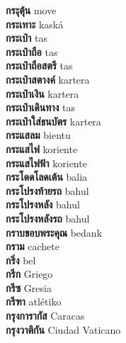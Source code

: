 \textbf{ กระุตุ้น  } move \\
\textbf{ กระเทาะ  } kaská \\
\textbf{ กระเป๋า  } tas \\
\textbf{ กระเป๋าถือ  } tas \\
\textbf{ กระเป๋าถือสตรี  } tas \\
\textbf{ กระเป๋าสตางค์  } kartera \\
\textbf{ กระเป๋าเงิน  } kartera \\
\textbf{ กระเป๋าเดินทาง  } tas \\
\textbf{ กระเป๋าใส่ธนบัตร  } kartera \\
\textbf{ กระแสลม  } bientu \\
\textbf{ กระแสไฟ  } koriente \\
\textbf{ กระแสไฟฟ้า  } koriente \\
\textbf{ กระโดดโลดเต้น  } balia \\
\textbf{ กระโปรงท้ายรถ  } bahul \\
\textbf{ กระโปรงหลัง  } bahul \\
\textbf{ กระโปรงหลังรถ  } bahul \\
\textbf{ กราบขอบพระคุณ  } bedank \\
\textbf{ กราม  } cachete \\
\textbf{ กริ่ง  } bel \\
\textbf{ กรีก  } Griego \\
\textbf{ กรีซ  } Gresia \\
\textbf{ กรีฑา  } atlétiko \\
\textbf{ กรุงการากัส  } Caracas \\
\textbf{ กรุงวาติกัน  } Ciudad Vaticano \\
